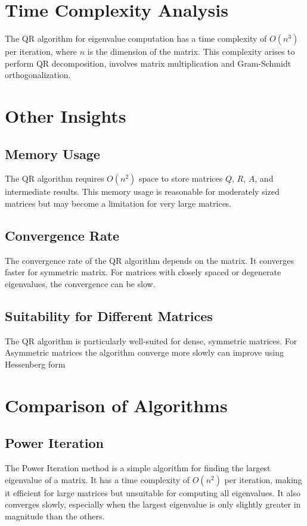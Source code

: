 \documentclass[11pt]{report}
\begin{document}
\section{Time Complexity Analysis}
The QR algorithm for eigenvalue computation has a time complexity of $O(n^3)$ per iteration, where $n$ is the dimension of the matrix. This complexity arises to perform QR decomposition, involves matrix multiplication and Gram-Schmidt orthogonalization.


\section{Other Insights}
\subsection{Memory Usage}
The QR algorithm requires $O(n^2)$ space to store matrices $Q$, $R$, $A$, and intermediate results. This memory usage is reasonable for moderately sized matrices but may become a limitation for very large matrices.

\subsection{Convergence Rate}
The convergence rate of the QR algorithm depends on the matrix. It converges faster for symmetric matrix. For matrices with closely spaced or degenerate eigenvalues, the convergence can be slow.

\subsection{Suitability for Different Matrices}
The QR algorithm is particularly well-suited for dense, symmetric matrices. For Asymmetric  matrices the algorithm converge more slowly can improve using Hessenberg form

\section{Comparison of Algorithms}
\subsection{Power Iteration}
The Power Iteration method is a simple algorithm for finding the largest eigenvalue of a matrix. It has a time complexity of $O(n^2)$ per iteration, making it efficient for large matrices but unsuitable for computing all eigenvalues. It also converges slowly, especially when the largest eigenvalue is only slightly greater in magnitude than the others.
\end{document}
